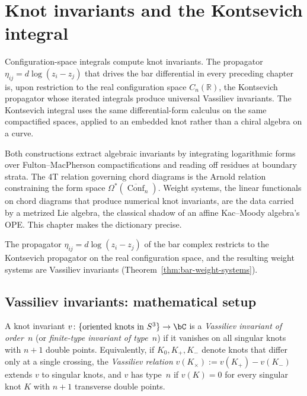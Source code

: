 \chapter{Knot invariants and the Kontsevich integral}
\label{v1-ch:kontsevich-integral}


Configuration-space integrals compute knot invariants. The propagator
$\eta_{ij} = d\log(z_i - z_j)$ that drives the bar differential in
every preceding chapter is, upon restriction to the real
configuration space $C_n(\mathbb{R})$, the Kontsevich propagator
whose iterated integrals produce universal Vassiliev invariants.
The Kontsevich integral uses the same differential-form
calculus on the same compactified spaces, applied to an embedded knot rather than a chiral algebra on a
curve.

Both constructions
extract algebraic invariants by integrating logarithmic forms over
Fulton--MacPherson compactifications and reading off residues at
boundary strata. The 4T relation governing chord diagrams is the
Arnold relation constraining the form space
$\Omega^*(\overline{\operatorname{Conf}}_n)$. Weight systems,
the linear functionals on chord diagrams that produce numerical knot
invariants, are the data carried by a metrized Lie
algebra, the classical shadow of an affine Kac--Moody
algebra's OPE. This chapter makes the dictionary precise.

The propagator $\eta_{ij} = d\log(z_i - z_j)$ of the bar complex
restricts to the Kontsevich propagator on the real configuration
space, and the resulting weight systems are Vassiliev invariants
(Theorem~\ref{thm:bar-weight-systems}).

\section{Vassiliev invariants: mathematical setup}
\label{sec:vassiliev-setup}

\begin{definition}
\label{def:vassiliev-invariant}
A knot invariant $v\colon \{\text{oriented knots in } S^3\} \to \bC$
is a \emph{Vassiliev invariant of order~$n$} (or \emph{finite-type
invariant of type~$n$}) if it vanishes on all singular knots with
$n+1$ double points. Equivalently, if $K_0, K_+, K_-$ denote knots
that differ only at a single crossing, the \emph{Vassiliev relation}
$v(K_\times) := v(K_+) - v(K_-)$ extends $v$ to singular knots,
and $v$ has type~$n$ if $v(K)=0$ for every singular knot $K$ with
$n+1$ transverse double points.
\end{definition}

